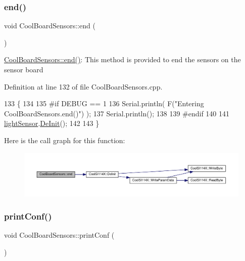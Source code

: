 \subsubsection{\texorpdfstring{end()}{end()}}
{\footnotesize\ttfamily void Cool\+Board\+Sensors\+::end (\begin{DoxyParamCaption}{ }\end{DoxyParamCaption})}

\hyperlink{class_cool_board_sensors_a4902b69f6e628bd6557193758fdd2bae}{Cool\+Board\+Sensors\+::end()}\+: This method is provided to end the sensors on the sensor board 

Definition at line 132 of file Cool\+Board\+Sensors.\+cpp.


\begin{DoxyCode}
133 \{
134 
135 \textcolor{preprocessor}{#if DEBUG == 1  }
136     Serial.println( F(\textcolor{stringliteral}{"Entering CoolBoardSensors.end()"}) );
137     Serial.println();
138 
139 \textcolor{preprocessor}{#endif}
140 
141     \hyperlink{class_cool_board_sensors_ac711c27d0927eb5e73be77f092c48be0}{lightSensor}.\hyperlink{class_cool_s_i114_x_a6840abd53a2e3d71a6bb918077c6d6e6}{DeInit}();
142 
143 \}
\end{DoxyCode}
Here is the call graph for this function\+:\nopagebreak
\begin{figure}[H]
\begin{center}
\leavevmode
\includegraphics[width=350pt]{de/d46/class_cool_board_sensors_a4902b69f6e628bd6557193758fdd2bae_cgraph}
\end{center}
\end{figure}
\mbox{\label{class_cool_board_sensors_af6fd79505815b204c178617ecf54c873}} 
\subsubsection{\texorpdfstring{print\+Conf()}{printConf()}}
{\footnotesize\ttfamily void Cool\+Board\+Sensors\+::print\+Conf (\begin{DoxyParamCaption}{ }\end{DoxyParamCaption})}

